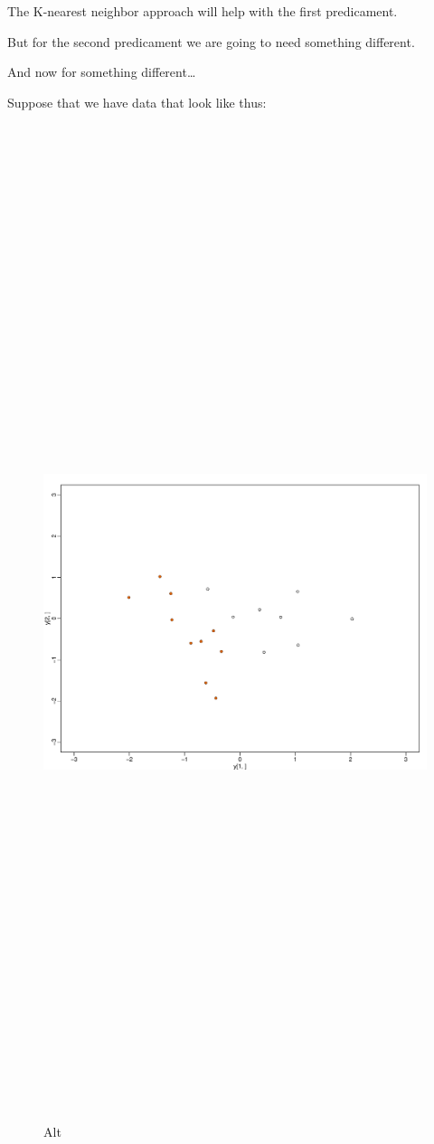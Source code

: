 \documentclass[
]{article}
\begin{document}
The K-nearest neighbor approach will help with the first predicament.

But for the second predicament we are going to need something different.

And now for something different\ldots{}

Suppose that we have data that look like thus:

\begin{figure}
\centering
\includegraphics[width=1\textwidth,height=12.5in]{MMCpointsonly.pdf}
\caption{Alt}
\end{figure}
\end{document}
